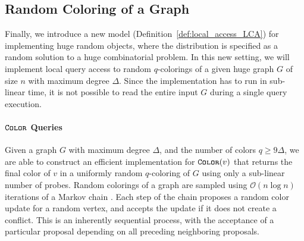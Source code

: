\subsection{Random Coloring of a Graph}
\label{sec:overview_random_coloring_of_a_graph}
Finally, we introduce a new model (Definition~\ref{def:local_access_LCA}) for implementing huge random objects,
where the distribution is specified as a random solution to a huge combinatorial problem.
In this new setting, we will implement local query access to random $q$-colorings of a given huge graph $G$ of size $n$ with maximum degree $\Delta$.
Since the implementation has to run in sub-linear time, it is not possible to read the entire input $G$ during a single query execution.


\paragraph*{$\texttt{\textsc{Color}}$ Queries}
\label{par:color_queries}
Given a graph $G$ with maximum degree $\Delta$, and the number of colors $q\ge 9\Delta$,
we are able to construct an efficient implementation for $\texttt{\textsc{Color}}(v)$ that returns the final color of $v$
in a uniformly random $q$-coloring of $G$ using only a sub-linear number of probes.
Random colorings of a graph are sampled using $\mathcal O(n\log n)$ iterations of a Markov chain \cite{glauber_survey}.
Each step of the chain proposes a random color update for a random vertex, and accepts the update if it does not create a conflict.
This is an inherently sequential process, with the acceptance of a particular proposal depending on all preceding neighboring proposals.

